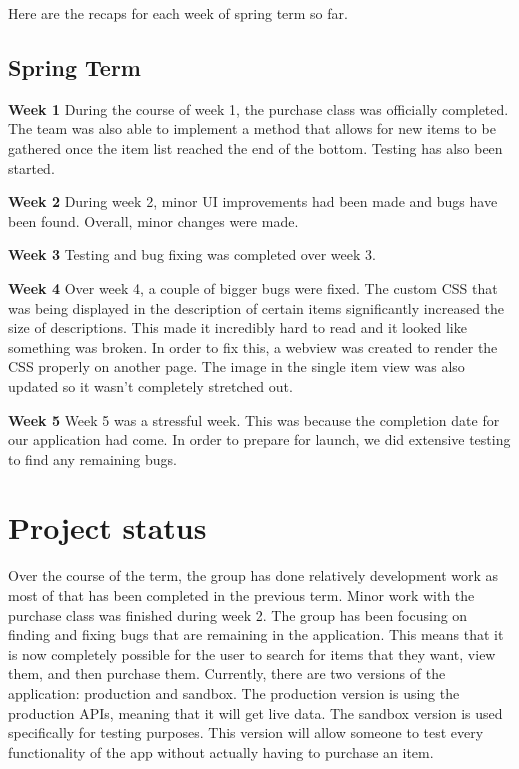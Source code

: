\documentclass[journal,compsoc, 10pt, draftclsnofoot, onecolumn]{IEEEtran}
\begin{document}
Here are the recaps for each week of spring term so far.

\subsection{Spring Term}
\textbf{Week 1}\newline
During the course of week 1, the purchase class was officially completed. The team 
was also able to implement a method that allows for new items to be gathered once 
the item list reached the end of the bottom. Testing has also been started.

\textbf{Week 2}\newline
During week 2, minor UI improvements had been made and bugs have been found. 
Overall, minor changes were made.

\textbf{Week 3}\newline
Testing and bug fixing was completed over week 3.

\textbf{Week 4}\newline
Over week 4, a couple of bigger bugs were fixed. The custom CSS that was being 
displayed in the description of certain items significantly increased the size of descriptions. 
This made it incredibly hard to read and it looked like something was broken. In order to 
fix this, a webview was created to render the CSS properly on another page. The 
image in the single item view was also updated so it wasn't completely stretched out.

\textbf{Week 5}\newline
Week 5 was a stressful week. This was because the completion date for our 
application had come. In order to prepare for launch, we did extensive testing to 
find any remaining bugs. 

\section{Project status}
Over the course of the term, the group has done relatively development work as 
most of that has been completed in the previous term. Minor work with the purchase 
class was finished during week 2. The group has been focusing on finding and fixing 
bugs that are remaining in the application. This means that it is now completely 
possible for the user to search for items that they want, view them, and then 
purchase them. Currently, there are two versions of the application: production 
and sandbox. The production version is using the production APIs, meaning that 
it will get live data. The sandbox version is used specifically for testing purposes. 
This version will allow someone to test every functionality of the app without 
actually having to purchase an item. 
\end{document}
